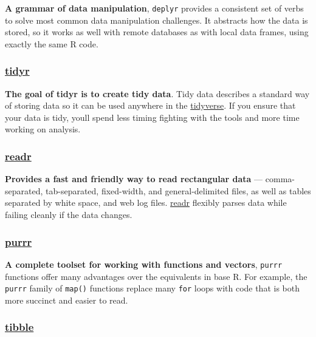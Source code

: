 \documentclass[]{book}
\theoremstyle{definition}
\theoremstyle{definition}
\theoremstyle{definition}
\theoremstyle{remark}
\begin{document}
\textbf{A grammar of data manipulation}, \texttt{deplyr} provides a
consistent set of verbs to solve most common data manipulation
challenges. It abstracts how the data is stored, so it works as well
with remote databases as with local data frames, using exactly the same
R code.

\hypertarget{tidyr}{%
\subsubsection{\texorpdfstring{
\href{http://tidyr.tidyverse.org/}{tidyr}}{ tidyr}}\label{tidyr}}

\textbf{The goal of tidyr is to create tidy data}. Tidy data describes a
standard way of storing data so it can be used anywhere in the
\href{https://www.tidyverse.org/}{tidyverse}. If you ensure that your
data is tidy, youll spend less timing fighting with the tools and more
time working on analysis.

\hypertarget{readr}{%
\subsubsection{\texorpdfstring{
\href{http://readr.tidyverse.org/}{readr}}{ readr}}\label{readr}}

\textbf{Provides a fast and friendly way to read rectangular data} ---
comma-separated, tab-separated, fixed-width, and general-delimited
files, as well as tables separated by white space, and web log files.
\href{http://readr.tidyverse.org/}{readr} flexibly parses data while
failing cleanly if the data changes.

\hypertarget{purrr}{%
\subsubsection{\texorpdfstring{
\href{http://purrr.tidyverse.org/}{purrr}}{ purrr}}\label{purrr}}

\textbf{A complete toolset for working with functions and vectors},
\texttt{purrr} functions offer many advantages over the equivalents in
base R. For example, the \texttt{purrr} family of \texttt{map()}
functions replace many \texttt{for} loops with code that is both more
succinct and easier to read.

\hypertarget{tibble}{%
\subsubsection{\texorpdfstring{
\href{http://tibble.tidyverse.org/}{tibble}}{ tibble}}\label{tibble}}
\end{document}
